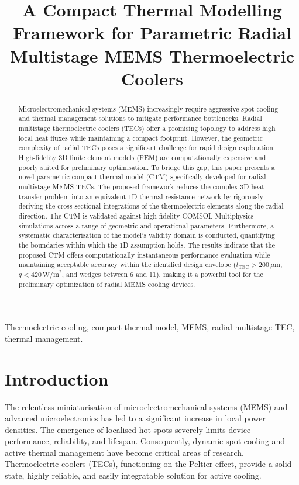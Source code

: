 \documentclass[conference,a4paper]{IEEEtran}
\begin{document}
\title{A Compact Thermal Modelling Framework for Parametric Radial Multistage MEMS Thermoelectric Coolers}

\author{
}

\maketitle

\begin{abstract}
	Microelectromechanical systems (MEMS) increasingly require aggressive spot cooling and thermal management solutions to mitigate performance bottlenecks. Radial multistage thermoelectric coolers (TECs) offer a promising topology to address high local heat fluxes while maintaining a compact footprint. However, the geometric complexity of radial TECs poses a significant challenge for rapid design exploration. High-fidelity 3D finite element models (FEM) are computationally expensive and poorly suited for preliminary optimisation. To bridge this gap, this paper presents a novel parametric compact thermal model (CTM) specifically developed for radial multistage MEMS TECs. The proposed framework reduces the complex 3D heat transfer problem into an equivalent 1D thermal resistance network by rigorously deriving the cross-sectional integrations of the thermoelectric elements along the radial direction. The CTM is validated against high-fidelity COMSOL Multiphysics simulations across a range of geometric and operational parameters. Furthermore, a systematic characterisation of the model's validity domain is conducted, quantifying the boundaries within which the 1D assumption holds. The results indicate that the proposed CTM offers computationally instantaneous performance evaluation while maintaining acceptable accuracy within the identified design envelope ($t_{\text{TEC}} > 200\,\mu\text{m}$, $q < 420\,\text{W/m}^2$, and wedges between 6 and 11), making it a powerful tool for the preliminary optimization of radial MEMS cooling devices.
\end{abstract}

\begin{IEEEkeywords}
	Thermoelectric cooling, compact thermal model, MEMS, radial multistage TEC, thermal management.
\end{IEEEkeywords}

\section{Introduction}
The relentless miniaturisation of microelectromechanical systems (MEMS) and advanced microelectronics has led to a significant increase in local power densities. The emergence of localised hot spots severely limits device performance, reliability, and lifespan. Consequently, dynamic spot cooling and active thermal management have become critical areas of research. Thermoelectric coolers (TECs), functioning on the Peltier effect, provide a solid-state, highly reliable, and easily integratable solution for active cooling.
\end{document}
